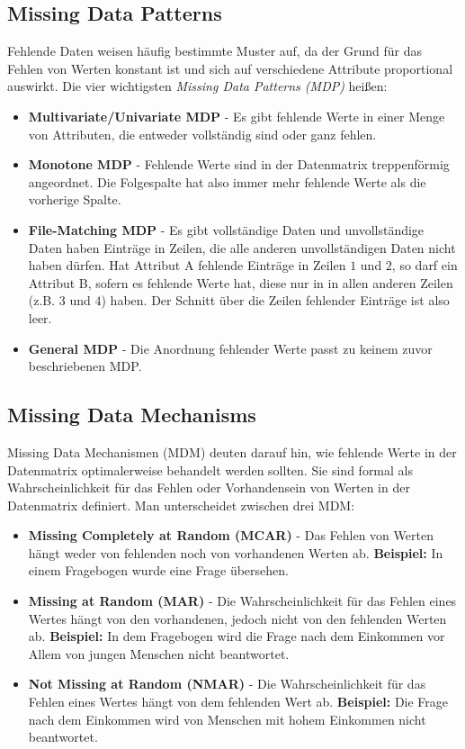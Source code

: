 \documentclass[11pt,ceqn]{book}
\begin{document}
\subsection{Missing Data Patterns}
Fehlende Daten weisen häufig bestimmte Muster auf, da der Grund für das Fehlen von Werten konstant ist und sich auf verschiedene Attribute proportional auswirkt. Die vier wichtigsten \textit{Missing Data Patterns (MDP)} heißen:
\begin{itemize}
\item \textbf{Multivariate/Univariate MDP} - Es gibt fehlende Werte in einer Menge von Attributen, die entweder vollständig sind oder ganz fehlen.
\item \textbf{Monotone MDP} - Fehlende Werte sind in der Datenmatrix treppenförmig angeordnet. Die Folgespalte hat also immer mehr fehlende Werte als die vorherige Spalte.
\item \textbf{File-Matching MDP} - Es gibt vollständige Daten und unvollständige Daten haben Einträge in Zeilen, die alle anderen unvollständigen Daten nicht haben dürfen. Hat Attribut A fehlende Einträge in Zeilen $1$ und $2$, so darf ein Attribut B, sofern es fehlende Werte hat, diese nur in in allen anderen Zeilen (z.B. $3$ und $4$) haben. Der Schnitt über die Zeilen fehlender Einträge ist also leer.
\item \textbf{General MDP} - Die Anordnung fehlender Werte passt zu keinem zuvor beschriebenen MDP.
\end{itemize}

\subsection{Missing Data Mechanisms}
Missing Data Mechanismen (MDM) deuten darauf hin, wie fehlende Werte in der Datenmatrix optimalerweise behandelt werden sollten. Sie sind formal als Wahrscheinlichkeit für das Fehlen oder Vorhandensein von Werten in der Datenmatrix definiert. Man unterscheidet zwischen drei MDM: 
\begin{itemize}
\item \textbf{Missing Completely at Random (MCAR)} - Das Fehlen von Werten hängt weder von fehlenden noch von vorhandenen Werten ab. \textbf{Beispiel:} In einem Fragebogen wurde eine Frage übersehen.
\item \textbf{Missing at Random (MAR)} - Die Wahrscheinlichkeit für das Fehlen eines Wertes hängt von den vorhandenen, jedoch nicht von den fehlenden Werten ab. \textbf{Beispiel:} In dem Fragebogen wird die Frage nach dem Einkommen vor Allem von jungen Menschen nicht beantwortet. 
\item \textbf{Not Missing at Random (NMAR)} - Die Wahrscheinlichkeit für das Fehlen eines Wertes hängt von dem fehlenden Wert ab. \textbf{Beispiel:} Die Frage nach dem Einkommen wird von Menschen mit hohem Einkommen nicht beantwortet.
\end{itemize}
\end{document}
